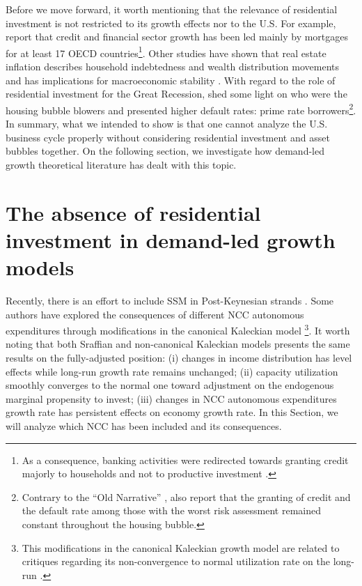 \documentclass[11pt]{article}
\begin{document}
Before we move forward, it worth mentioning that the relevance of residential investment is not restricted to its growth effects nor to the U.S. 
For example, \textcite{jorda_great_2016} report that credit and financial sector growth has been led mainly by mortgages for at least 17 OECD countries\footnote{As a consequence, banking activities were redirected towards granting credit majorly to households and not to productive investment \cites{erturk_banks_2007}{kohl_more_2018}.}. 
Other studies have shown that real estate inflation describes household indebtedness and wealth distribution movements and has implications for macroeconomic stability \cites{ryoo_household_2016}{stockhammer_debt-driven_2016}{barnes_private_2016}{johnston_global_2017}{mian_household_2017}{anderson_politics_2020}{fuller_housing_2020}. 
With regard to the role of residential investment for the Great Recession, \textcite{albanesi_credit_2017} shed some light on who were the housing bubble blowers and presented higher default rates: prime rate borrowers\footnote{Contrary to the ``Old Narrative'' \cite{mian_consequences_2009},  \textcite{albanesi_credit_2017}  also report that the granting of credit and the default rate among those with the worst risk assessment remained constant throughout the housing bubble.}.
In summary, what we intended to show is that one cannot analyze the U.S. business cycle properly without considering residential investment and asset bubbles together.
On the following section, we investigate how demand-led growth theoretical literature has dealt with this topic.


\section{The absence of residential investment in demand-led growth models}
\label{sec:org0e7bea6}
\label{sec:Review}
Recently, there is an effort to include SSM in Post-Keynesian strands \cite{lavoie_post-keynesian_2015}.
Some authors have explored the consequences of  different NCC autonomous expenditures through modifications in the canonical Kaleckian model \cites{allain_tackling_2015}{lavoie_convergence_2016}\footnote{This modifications in the canonical Kaleckian growth model are related to critiques regarding its non-convergence to normal utilization rate on the long-run \cites{dallery_conflicting_2011}{skott_theoretical_2012}{hein_harrodian_2012}.}.
It worth noting that both Sraffian and non-canonical Kaleckian models presents the same results on the fully-adjusted position:
(i) changes in income distribution has level effects while long-run growth rate remains unchanged;
(ii) capacity utilization smoothly converges to the normal one toward adjustment on the endogenous marginal propensity to invest;
(iii) changes in NCC autonomous expenditures growth rate has persistent effects on economy growth rate.
In this Section, we will analyze which NCC has been included and its consequences.
\end{document}
